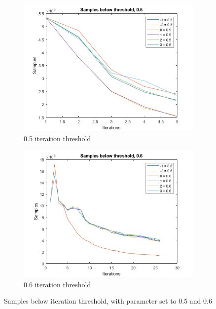 \begin{figure}
    \centering
    \begin{subfigure}[b]{.49\textwidth}
        \centering
        \includegraphics[width=\textwidth]{figures/iterbelow-0.5.png}
        \caption{0.5 iteration threshold}
        \label{sfig:iter:iterbelow0.5}
    \end{subfigure}
    \hfill
    \begin{subfigure}[b]{.49\textwidth}
        \centering
        \includegraphics[width=\textwidth]{figures/iterbelow-0.6.png}
        \caption{0.6 iteration threshold}
        \label{sfig:iter:iterbelow0.6}
    \end{subfigure}
    \caption{Samples below iteration threshold, with parameter set to 0.5 and 0.6}
    \label{fig:iter:iterbelow0.50.6}
\end{figure}

